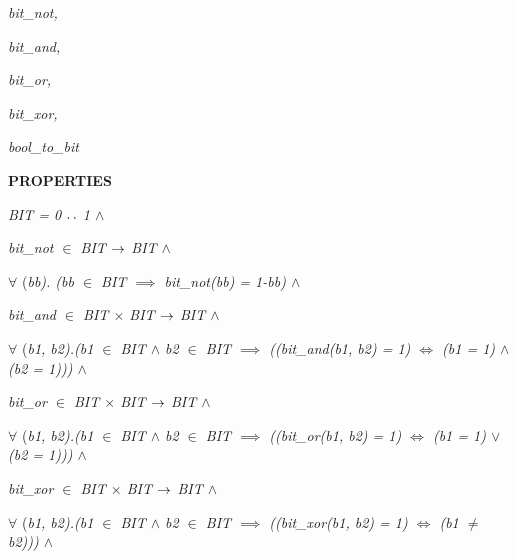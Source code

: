 \begin{sloppypar}
\hspace*{0.20in}\it bit\_not\rm ,

\hspace*{0.20in}\it bit\_and\rm ,

\hspace*{0.20in}\it bit\_or\rm ,

\hspace*{0.20in}\it bit\_xor\rm ,

\hspace*{0.20in}\it bool\_to\_bit

\vspace*{4mm}
\bf PROPERTIES

\hspace*{0.20in}\it BIT \rm = \rm 0 $\mathbin{\ldotp\ldotp}$ \rm 1  $\land$ 

\hspace*{0.20in}\it bit\_not  $\in$  \it BIT  $\rightarrow$  \it BIT  $\land$ 

\hspace*{0.20in} $\forall$  \rm (\it bb\rm )\rm . \rm (\it bb  $\in$  \it BIT  $\implies$  \it bit\_not\rm (\it bb\rm ) \rm = \rm 1\rm -\it bb\rm )  $\land$ 

\hspace*{0.20in}\it bit\_and  $\in$  \it BIT  $\times$  \it BIT  $\rightarrow$  \it BIT  $\land$ 

\hspace*{0.20in} $\forall$  \rm (\it b1\rm , \it b2\rm )\rm .\rm (\it b1  $\in$  \it BIT  $\land$  \it b2  $\in$  \it BIT  $\implies$  \rm (\rm (\it bit\_and\rm (\it b1\rm , \it b2\rm ) \rm = \rm 1\rm )  $\iff$  \rm (\it b1 \rm = \rm 1\rm )  $\land$  \rm (\it b2 \rm = \rm 1\rm )\rm )\rm )  $\land$ 

\hspace*{0.20in}\it bit\_or  $\in$  \it BIT  $\times$  \it BIT  $\rightarrow$  \it BIT  $\land$ 

\hspace*{0.20in} $\forall$  \rm (\it b1\rm , \it b2\rm )\rm .\rm (\it b1  $\in$  \it BIT  $\land$  \it b2  $\in$  \it BIT  $\implies$  \rm (\rm (\it bit\_or\rm (\it b1\rm , \it b2\rm ) \rm = \rm 1\rm )  $\iff$  \rm (\it b1 \rm = \rm 1\rm )  $\lor$  \rm (\it b2 \rm = \rm 1\rm )\rm )\rm )  $\land$ 

\hspace*{0.20in}\it bit\_xor  $\in$  \it BIT  $\times$  \it BIT  $\rightarrow$  \it BIT  $\land$ 

\hspace*{0.20in} $\forall$  \rm (\it b1\rm , \it b2\rm )\rm .\rm (\it b1  $\in$  \it BIT  $\land$  \it b2  $\in$  \it BIT  $\implies$  \rm (\rm (\it bit\_xor\rm (\it b1\rm , \it b2\rm ) \rm = \rm 1\rm )  $\iff$  \rm (\it b1  $\not =$  \it b2\rm )\rm )\rm )  $\land$ 


\end{sloppypar}
